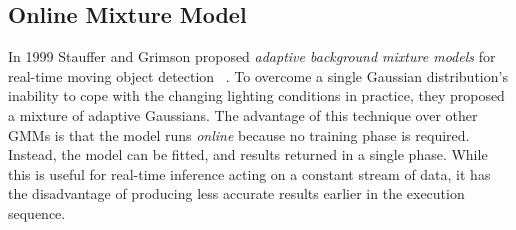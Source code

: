 \setlength{\leftskip}{0cm}
\subsection{Online Mixture Model}
\label{sec:OMM}
\setlength{\leftskip}{0.5cm}
\indent \indent
In 1999 Stauffer and Grimson proposed \textit{adaptive background mixture models} for real-time moving object detection ~\cite{Stauffer}. To overcome a single Gaussian distribution's inability to cope with the changing lighting conditions in practice, they proposed a mixture of adaptive Gaussians. The advantage of this technique over other GMMs is that the model runs \textit{online} because no training phase is required. Instead, the model can be fitted, and results returned in a single phase. While this is useful for real-time inference acting on a constant stream of data, it has the disadvantage of producing less accurate results earlier in the execution sequence.

\setlength{\leftskip}{0cm}
